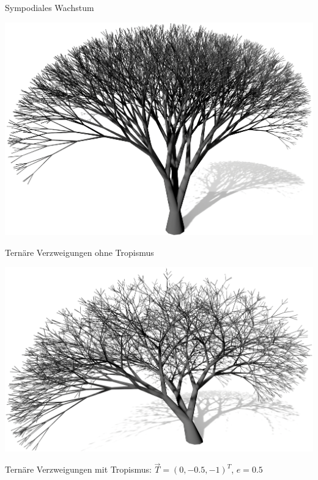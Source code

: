 \begin{center}
	Sympodiales Wachstum
\end{center}







\newpage
\begin{center}
	\includegraphics[height=.9\textheight]{images/LS_Ternary_2}
	
	Ternäre Verzweigungen ohne Tropismus
\end{center}






\newpage
\begin{center}
	\includegraphics[height=.9\textheight]{images/LS_Ternary_2_Tropism}

	Ternäre Verzweigungen mit Tropismus: $\overrightarrow{T} = (0, -0.5, -1)^T$, $e = 0.5$	
\end{center}








